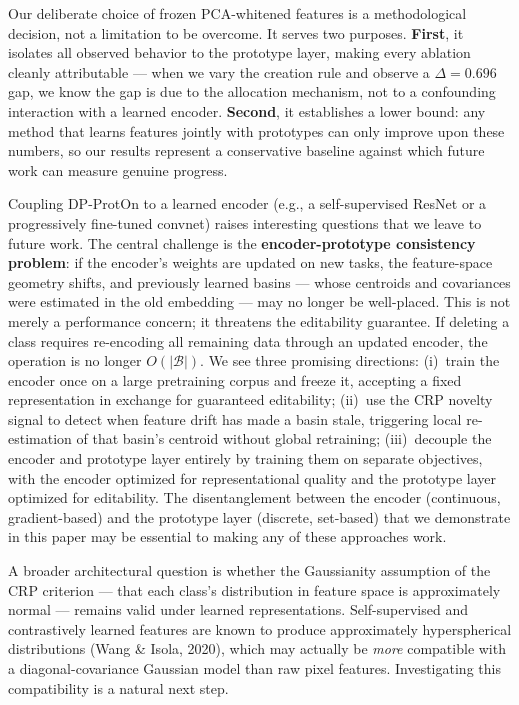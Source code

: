 \documentclass[11pt,a4paper]{article}
\begin{document}
Our deliberate choice of frozen PCA-whitened features is a methodological decision, not a limitation to be overcome. It serves two purposes. \textbf{First}, it isolates all observed behavior to the prototype layer, making every ablation cleanly attributable --- when we vary the creation rule and observe a $\Delta=0.696$ gap, we know the gap is due to the allocation mechanism, not to a confounding interaction with a learned encoder. \textbf{Second}, it establishes a lower bound: any method that learns features jointly with prototypes can only improve upon these numbers, so our results represent a conservative baseline against which future work can measure genuine progress.

Coupling DP-ProtOn to a learned encoder (e.g., a self-supervised ResNet or a progressively fine-tuned convnet) raises interesting questions that we leave to future work. The central challenge is the \textbf{encoder-prototype consistency problem}: if the encoder's weights are updated on new tasks, the feature-space geometry shifts, and previously learned basins --- whose centroids and covariances were estimated in the old embedding --- may no longer be well-placed. This is not merely a performance concern; it threatens the editability guarantee. If deleting a class requires re-encoding all remaining data through an updated encoder, the operation is no longer $O(|\mathcal{B}|)$. We see three promising directions: (i)~train the encoder once on a large pretraining corpus and freeze it, accepting a fixed representation in exchange for guaranteed editability; (ii)~use the CRP novelty signal to detect when feature drift has made a basin stale, triggering local re-estimation of that basin's centroid without global retraining; (iii)~decouple the encoder and prototype layer entirely by training them on separate objectives, with the encoder optimized for representational quality and the prototype layer optimized for editability. The disentanglement between the encoder (continuous, gradient-based) and the prototype layer (discrete, set-based) that we demonstrate in this paper may be essential to making any of these approaches work.

A broader architectural question is whether the Gaussianity assumption of the CRP criterion --- that each class's distribution in feature space is approximately normal --- remains valid under learned representations. Self-supervised and contrastively learned features are known to produce approximately hyperspherical distributions (Wang \& Isola, 2020), which may actually be \textit{more} compatible with a diagonal-covariance Gaussian model than raw pixel features. Investigating this compatibility is a natural next step.
\end{document}
